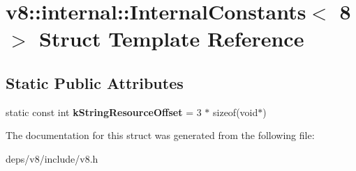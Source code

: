 \hypertarget{structv8_1_1internal_1_1_internal_constants_3_018_01_4}{}\section{v8\+:\+:internal\+:\+:Internal\+Constants$<$ 8 $>$ Struct Template Reference}
\label{structv8_1_1internal_1_1_internal_constants_3_018_01_4}
\subsection*{Static Public Attributes}
\begin{DoxyCompactItemize}
\item 
\hypertarget{structv8_1_1internal_1_1_internal_constants_3_018_01_4_a95faec00d49358d58aafd8cd10257e76}{}static const int {\bfseries k\+String\+Resource\+Offset} = 3 $\ast$ sizeof(void$\ast$)\label{structv8_1_1internal_1_1_internal_constants_3_018_01_4_a95faec00d49358d58aafd8cd10257e76}

\end{DoxyCompactItemize}


The documentation for this struct was generated from the following file\+:\begin{DoxyCompactItemize}
\item 
deps/v8/include/v8.\+h\end{DoxyCompactItemize}
